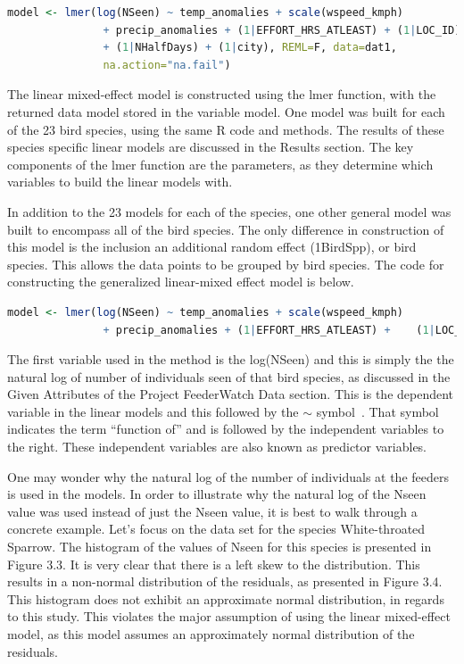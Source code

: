 \begin{lstlisting}[language=R]
model <- lmer(log(NSeen) ~ temp_anomalies + scale(wspeed_kmph) 
               + precip_anomalies + (1|EFFORT_HRS_ATLEAST) + (1|LOC_ID) 
               + (1|NHalfDays) + (1|city), REML=F, data=dat1, 
               na.action="na.fail")
\end{lstlisting}

The linear mixed-effect model is constructed using the lmer function, with the returned data model stored in the variable model. One model was built for each of the 23 bird species, using the same R code and methods. The results of these species specific linear models are discussed in the Results section. The key components of the lmer function are the parameters, as they determine which variables to build the linear models with. 

In addition to the 23 models for each of the species, one other general model was built to encompass all of the bird species. The only difference in construction of this model is the inclusion an additional random effect (1\textbar BirdSpp), or bird species. This allows the data points to be grouped by bird species. The code for constructing the generalized linear-mixed effect model is below.

\begin{lstlisting}[language=R]
model <- lmer(log(NSeen) ~ temp_anomalies + scale(wspeed_kmph) 
               + precip_anomalies + (1|EFFORT_HRS_ATLEAST) +	(1|LOC_ID) + (1|NHalfDays) + (1|city) + (1|BirdSpp), REML=F, data=dat2, na.action="na.fail")
\end{lstlisting}

The first variable used in the method is the log(NSeen) and this is simply the the natural log of number of individuals seen of that bird species, as discussed in the Given Attributes of the Project FeederWatch Data section. This is the dependent variable in the linear models and this followed by the $\sim$ symbol~\cite{RLinearModel:online}. That symbol indicates the term ``function of'' and is followed by the independent variables to the right. These independent variables are also known as predictor variables.

One may wonder why the natural log of the number of individuals at the feeders is used in the models. In order to illustrate why the natural log of the Nseen value was used instead of just the Nseen value, it is best to walk through a concrete example. Let's focus on the data set for the species White-throated Sparrow. The histogram of the values of Nseen for this species is presented in Figure 3.3. It is very clear that there is a left skew to the distribution. This results in a non-normal distribution of the residuals, as presented in Figure 3.4. This histogram does not exhibit an approximate normal distribution, in regards to this study. This violates the major assumption of using the linear mixed-effect model, as this model assumes an approximately normal distribution of the residuals.

